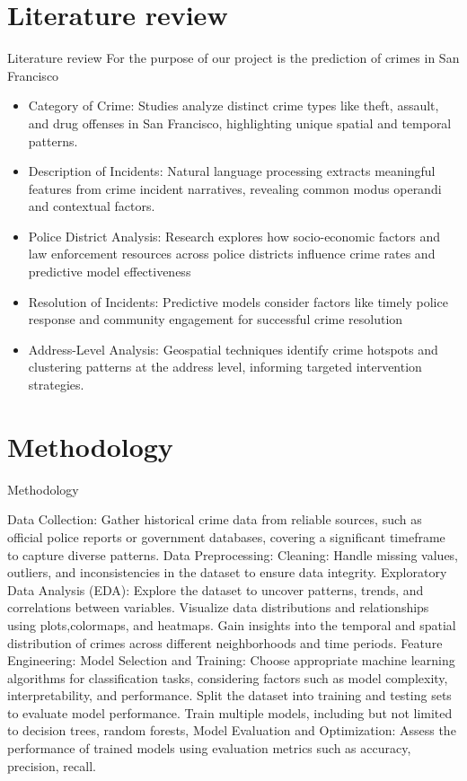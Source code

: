 \documentclass{beamer}
\begin{document}
\section{Literature review}
\begin{frame}{Literature review}
For the purpose of our project is the prediction of crimes in San Francisco
\begin{itemize}
    \item Category of Crime: 
    Studies analyze distinct crime types like theft, assault, and drug offenses in San Francisco, highlighting unique spatial and temporal patterns.
    \item Description of Incidents: 
    Natural language processing extracts meaningful features from crime incident narratives, revealing common modus operandi and contextual factors.
    \item Police District Analysis: 
    Research explores how socio-economic factors and law enforcement resources across police districts influence crime rates and predictive model effectiveness
    \item Resolution of Incidents: 
    Predictive models consider factors like timely police response and community engagement for successful crime resolution
    \item Address-Level Analysis: 
    Geospatial techniques identify crime hotspots and clustering patterns at the address level, informing targeted intervention strategies.
\end{itemize}
\end{frame}
\section{Methodology}
\begin{frame}{Methodology}

Data Collection: Gather historical crime data from reliable sources, such as official police reports or government databases, covering a significant timeframe to capture diverse patterns.
Data Preprocessing:
Cleaning: Handle missing values, outliers, and inconsistencies in the dataset to ensure data integrity.
Exploratory Data Analysis (EDA):
Explore the dataset to uncover patterns, trends, and correlations between variables.
Visualize data distributions and relationships using plots,colormaps, and heatmaps.
Gain insights into the temporal and spatial distribution of crimes across different neighborhoods and time periods.
Feature Engineering:
Model Selection and Training:
Choose appropriate machine learning algorithms for classification tasks, considering factors such as model complexity, interpretability, and performance.
Split the dataset into training and testing sets to evaluate model performance.
Train multiple models, including but not limited to decision trees, random forests, 
Model Evaluation and Optimization:
Assess the performance of trained models using evaluation metrics such as accuracy, precision, recall.




\end{frame}
\end{document}

